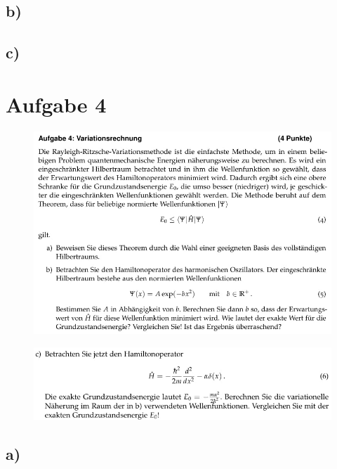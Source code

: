 \subsection{b)}

\subsection{c)}

\section{Aufgabe 4}

    \begin{figure}[H]
        \centering
        \includegraphics[width=\textwidth]{images/Aufgabe4a.jpg}
        \label{fig:5}
    \end{figure}

    \begin{figure}[H]
        \centering
        \includegraphics[width=\textwidth]{images/Aufgabe4b.jpg}
        \label{fig:6}
    \end{figure}

\subsection{a)}

